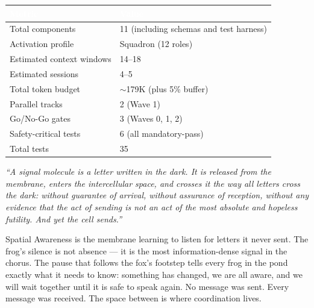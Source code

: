 \documentclass[11pt,letterpaper]{article}
\newcommand{\tableheader}[1]{\textbf{\sffamily\textcolor{white}{#1}}}
\begin{document}
\begin{center}
\begin{tabularx}{\textwidth}{L{5cm}X}
\toprule
{}
\tableheader{Metric} & \tableheader{Value} \\
\midrule
Total components & 11 (including schemas and test harness) \\
Activation profile & Squadron (12 roles) \\
Estimated context windows & 14--18 \\
Estimated sessions & 4--5 \\
Total token budget & $\sim$179K (plus 5\% buffer) \\
Parallel tracks & 2 (Wave 1) \\
Go/No-Go gates & 3 (Waves 0, 1, 2) \\
Safety-critical tests & 6 (all mandatory-pass) \\
Total tests & 35 \\
\bottomrule
\end{tabularx}
\end{center}

\vspace{1em}

\begin{quotebox}
\textit{``A signal molecule is a letter written in the dark. It is released from the membrane, enters the intercellular space, and crosses it the way all letters cross the dark: without guarantee of arrival, without assurance of reception, without any evidence that the act of sending is not an act of the most absolute and hopeless futility. And yet the cell sends.''}

\vspace{0.5em}

Spatial Awareness is the membrane learning to listen for letters it never sent. The frog's silence is not absence --- it is the most information-dense signal in the chorus. The pause that follows the fox's footstep tells every frog in the pond exactly what it needs to know: something has changed, we are all aware, and we will wait together until it is safe to speak again. No message was sent. Every message was received. The space between is where coordination lives.
\end{quotebox}
\end{document}
